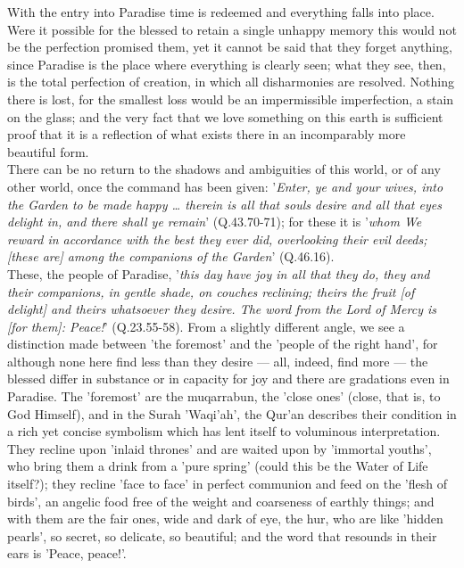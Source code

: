 \documentclass[10pt, twoside]{book}
\begin{document}
With the entry into Paradise time is redeemed and everything falls into place. Were it possible for 
the blessed to retain a single unhappy memory this would not be the perfection promised them, yet it 
cannot be said that they forget anything, since Paradise is the place where everything is clearly 
seen; what they see, then, is the total perfection of creation, in which all disharmonies are 
resolved. Nothing there is lost, for the smallest loss would be an impermissible imperfection, a 
stain on the glass; and the very fact that we love something on this earth is sufficient proof that 
it is a reflection of what exists there in an incomparably more beautiful form. \\

There can be no return to the shadows and ambiguities of this world, or of any other world, once the 
command has been given: '\emph{Enter, ye and your wives, into the Garden to be made happy \ldots{} therein is 
all that souls desire and all that eyes delight in, and there shall ye remain}' (Q.43.70\hyp{}71); for 
these it is '\emph{whom We reward in accordance with the best they ever did, overlooking their evil deeds; 
[these are] among the companions of the Garden}' (Q.46.16). \\

These, the people of Paradise, '\emph{this day have joy in all that they do, they and their companions, in 
gentle shade, on couches reclining; theirs the fruit [of delight] and theirs whatsoever they desire. 
The word from the Lord of Mercy is [for them]: Peace!}' (Q.23.55\hyp{}58). From a slightly different angle, 
we see a distinction made between 'the foremost' and the 'people of the right hand', for although 
none here find less than they desire --- all, indeed, find more --- the blessed differ in substance or in 
capacity for joy and there are gradations even in Paradise. The 'foremost' are the muqarrabun, the 
'close ones' (close, that is, to God Himself), and in the Surah 'Waqi'ah', the Qur'an describes their 
condition in a rich yet concise symbolism which has lent itself to voluminous interpretation. They 
recline upon 'inlaid thrones' and are waited upon by 'immortal youths', who bring them a drink from a 
'pure spring' (could this be the Water of Life itself?); they recline 'face to face' in perfect 
communion and feed on the 'flesh of birds', an angelic food free of the weight and coarseness of 
earthly things; and with them are the fair ones, wide and dark of eye, the hur, who are like 'hidden 
pearls', so secret, so delicate, so beautiful; and the word that resounds in their ears is 'Peace, 
peace!'. \\
\end{document}
